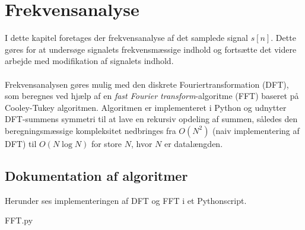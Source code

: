 \chapter{Frekvensanalyse}
I dette kapitel foretages der frekvensanalyse af det samplede signal $s[n]$. Dette gøres for at undersøge signalets frekvensmæssige indhold og fortsætte det videre arbejde med modifikation af signalets indhold.\\\\
Frekvensanalysen gøres mulig med den diskrete Fouriertransformation (DFT), som beregnes ved hjælp af en \textit{fast Fourier transform}-algoritme (FFT) baseret på Cooley-Tukey algoritmen. Algoritmen er implementeret i Python og udnytter DFT-summens symmetri til at lave en rekursiv opdeling af summen, således den beregningsmæssige kompleksitet nedbringes fra $O(N^2)$ (naiv implementering af DFT) til $O(N\log N)$ for store $N$, hvor $N$ er datalængden.
\section{Dokumentation af algoritmer}
Herunder ses implementeringen af DFT og FFT i et Pythonscript.
\begin{lstinputlisting}{FFT.py}
\end{lstinputlisting}
